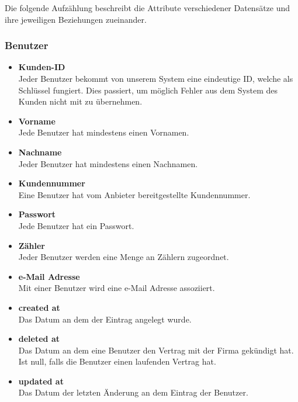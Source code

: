 Die folgende Aufzählung beschreibt die Attribute verschiedener Datensätze und ihre jeweiligen Beziehungen zueinander.

\subsubsection*{Benutzer}
	\begin{itemize}
	    \item \textbf{Kunden-ID}\hfill\\
	    Jeder Benutzer bekommt von unserem System eine eindeutige ID, welche als Schlüssel fungiert. Dies passiert, um möglich Fehler aus dem System des Kunden nicht mit zu übernehmen.
  		\item \textbf{Vorname}\hfill \\
  		Jede Benutzer hat mindestens einen Vornamen.
 		\item \textbf{Nachname}\hfill \\
 		Jeder Benutzer hat mindestens einen Nachnamen.
 		\item \textbf{Kundennummer}\hfill \\
 		Eine Benutzer hat vom Anbieter bereitgestellte Kundennummer.
 		\item \textbf{Passwort} \hfill \\
 		Jede Benutzer hat ein Passwort.
		\item \textbf{Zähler}\hfill \\
		Jeder Benutzer werden eine Menge an Zählern zugeordnet.
		\item \textbf{e-Mail Adresse}\hfill \\
		Mit einer Benutzer wird eine e-Mail Adresse assoziiert.
		\item \textbf{created at}\hfill \\
		Das Datum an dem der Eintrag angelegt wurde.
		\item \textbf{deleted at}\hfill \\
		Das Datum an dem eine Benutzer den Vertrag mit der Firma gekündigt hat. Ist null, falls die Benutzer einen laufenden Vertrag hat.
		\item \textbf{updated at}\hfill \\
		Das Datum der letzten Änderung an dem Eintrag der Benutzer.
	\end{itemize}
